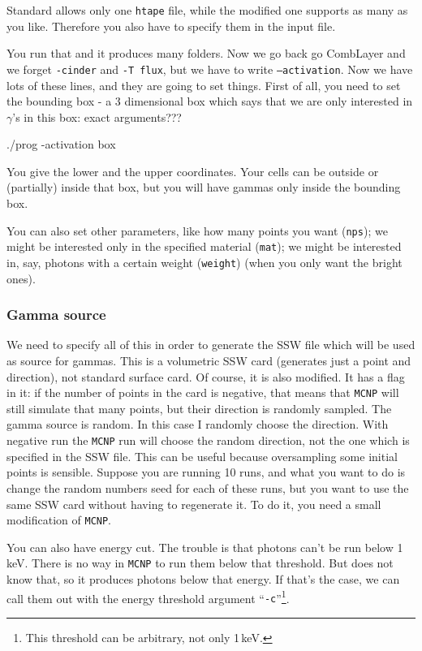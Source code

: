 Standard \cinder allows only one {\tt htape} file, while the modified one supports as many as you like. Therefore you also have to specify them in the input file.

You run that and it produces many folders. Now we go back go CombLayer and we forget {\tt -cinder} and {\tt -T flux}, but we have to write {\tt --activation}.
Now we have lots of these lines, and they are going to set things.
First of all, you need to set the bounding box - a 3 dimensional box which says that we are only interested in $\gamma$'s in this box:
\alert{exact arguments???}
\begin{bash}
./prog -activation box
\end{bash}
You give the lower and the upper coordinates. Your cells can be outside or (partially) inside that box, but you will have gammas only inside the bounding box.

You can also set other parameters, like how many points you want ({\tt nps}); we might be interested only in the specified material ({\tt mat});
we might be interested in, say, photons with a certain weight ({\tt weight}) (when you only want the bright ones).

\subsubsection{Gamma source}
We need to specify all of this in order to generate the SSW file which will be used as source for gammas.
This is a volumetric SSW card (generates just a point and direction),
not standard surface card. Of course, it is also modified. It has a flag in it: if the number of points in the card is negative, that means that {\tt MCNP} will still simulate that many points,
but their direction is randomly sampled. The gamma source is random.
In this case I randomly choose the direction. With negative run the {\tt MCNP} run will choose the random direction, not the one which is specified in the SSW file.
This can be useful because oversampling some initial points is sensible. Suppose you are running 10 runs, and what you want to do is change the random numbers seed for each of these runs, but you want to use the same SSW card without having to regenerate it. To do it, you need a small modification of {\tt MCNP}.

You can also have energy cut. The trouble is that photons can't be run below 1\,keV. There is no way in {\tt MCNP} to run them below that threshold. But \cinder does not know that, so it
produces photons below that energy. If that's the case, we can call them out with the energy threshold argument ``{\tt -c}''\footnote{This threshold can be arbitrary, not only 1\,keV.}.

